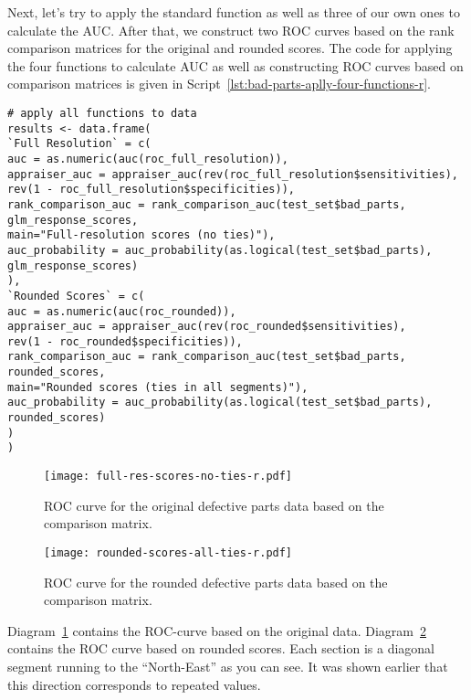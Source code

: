\documentclass[]{scrreprt}
\begin{document}
Next, let's try to apply the standard function as well as three of our own ones to calculate the AUC. After that, we construct two ROC curves based on the rank comparison matrices for the original and rounded scores. The code for applying the four functions to calculate AUC as well as constructing ROC curves based on comparison matrices is given in Script~\ref{lst:bad-parts-aplly-four-functions-r}.
%
\begin{lstlisting}[float=htp, caption = Using four functions to calculate AUC and plot ROC curves based on comparison matrices for original and rounded scores, firstnumber=1, label= lst:bad-parts-aplly-four-functions-r]
# apply all functions to data
results <- data.frame(
`Full Resolution` = c(
auc = as.numeric(auc(roc_full_resolution)),
appraiser_auc = appraiser_auc(rev(roc_full_resolution$sensitivities),
rev(1 - roc_full_resolution$specificities)),
rank_comparison_auc = rank_comparison_auc(test_set$bad_parts,
glm_response_scores, 
main="Full-resolution scores (no ties)"),
auc_probability = auc_probability(as.logical(test_set$bad_parts),
glm_response_scores)
),
`Rounded Scores` = c( 
auc = as.numeric(auc(roc_rounded)),
appraiser_auc = appraiser_auc(rev(roc_rounded$sensitivities),
rev(1 - roc_rounded$specificities)),
rank_comparison_auc = rank_comparison_auc(test_set$bad_parts, rounded_scores,
main="Rounded scores (ties in all segments)"),
auc_probability = auc_probability(as.logical(test_set$bad_parts),
rounded_scores)
)
)
\end{lstlisting}
%
\begin{figure}[htp]
	\centering
	\texttt{[image: full-res-scores-no-ties-r.pdf]}
	\caption{ROC curve for the original defective parts data based on the comparison matrix.}
	\label{fig:bad-parts-ROC-original-r}
\end{figure}
%
\begin{figure}[htp]
	\centering
	\texttt{[image: rounded-scores-all-ties-r.pdf]}
	\caption{ROC curve for the rounded defective parts data based on the comparison matrix.}
	\label{fig:bad-parts-ROC-rounded-r}
\end{figure}
%

Diagram~\ref{fig:bad-parts-ROC-original-r} contains the ROC-curve based on the original data. Diagram~\ref{fig:bad-parts-ROC-rounded-r} contains the ROC curve based on rounded scores. Each section is a diagonal segment running to the ``North-East'' as you can see. It was shown earlier that this direction corresponds to repeated values.
\end{document}

